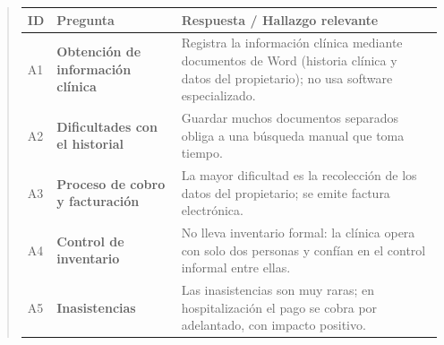 \documentclass[
]{article}
\newcounter{none} %
\begin{document}
\begin{quote}
{\def\LTcaptype{none} %
\begin{longtable}[]{|
  >{\centering\arraybackslash}p{}|
  >{\raggedright\arraybackslash}p{}|
  >{\raggedright\arraybackslash}p{}|}
\hline
\begin{minipage}[b]{\linewidth}\centering
\textbf{ID}
\end{minipage} & \begin{minipage}[b]{\linewidth}\centering
\textbf{Pregunta}
\end{minipage} & \begin{minipage}[b]{\linewidth}\raggedright
\textbf{Respuesta / Hallazgo relevante}
\end{minipage} \\
\hline
\endhead
\hline
\endlastfoot
A1 & \textbf{Obtención de información clínica} &
\begin{minipage}[t]{\linewidth}\raggedright
Registra la información clínica mediante documentos de Word (historia clínica y datos del propietario); no usa software especializado.
\end{minipage} \\
\hline
A2 & \textbf{Dificultades con el historial} &
\begin{minipage}[t]{\linewidth}\raggedright
Guardar muchos documentos separados obliga a una búsqueda manual que toma tiempo.
\end{minipage} \\
\hline
A3 & \textbf{Proceso de cobro y facturación} &
\begin{minipage}[t]{\linewidth}\raggedright
La mayor dificultad es la recolección de los datos del propietario; se emite factura electrónica.
\end{minipage} \\
\hline
A4 & \textbf{Control de inventario} &
\begin{minipage}[t]{\linewidth}\raggedright
No lleva inventario formal: la clínica opera con solo dos personas y confían en el control informal entre ellas.
\end{minipage} \\
\hline
A5 & \textbf{Inasistencias} &
\begin{minipage}[t]{\linewidth}\raggedright
Las inasistencias son muy raras; en hospitalización el pago se cobra por adelantado, con impacto positivo.
\end{minipage} \\

\end{longtable}}
\end{quote}
\end{document}
